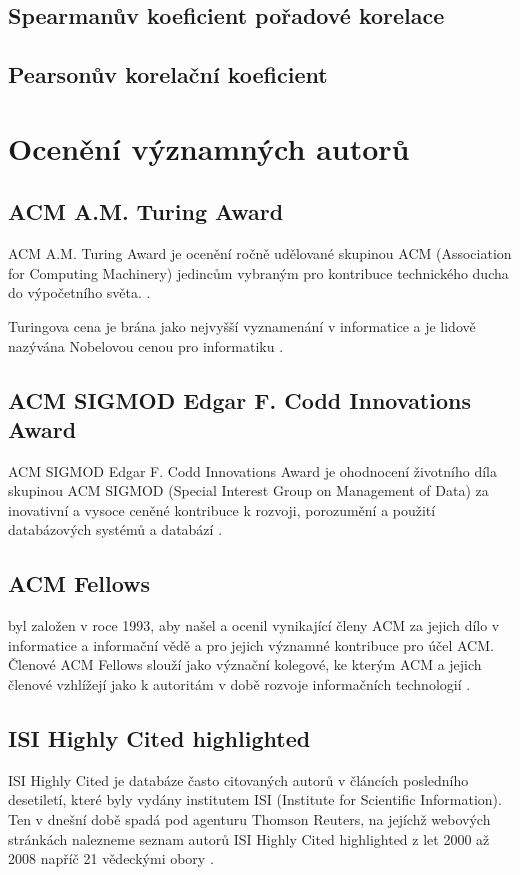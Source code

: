 \documentclass[12pt,titlepage]{report}
\begin{document}
\subsection{Spearmanův koeficient pořadové korelace}
\subsection{Pearsonův korelační koeficient}

\section{Ocenění významných autorů}
\subsection{ACM A.M. Turing Award}
ACM A.M. Turing Award je ocenění ročně udělované skupinou ACM (Association for
Computing Machinery) jedincům vybraným pro kontribuce technického ducha do
výpočetního světa.
\cite{turingaward}.

Turingova cena je brána jako nejvyšší vyznamenání v informatice a je lidově
nazývána Nobelovou cenou pro informatiku \cite[p.~317]{dasgupta}.

\subsection{ACM SIGMOD Edgar F. Codd Innovations Award}
ACM SIGMOD Edgar F. Codd Innovations Award je ohodnocení životního díla
skupinou ACM SIGMOD (Special Interest Group on Management of Data)  za
inovativní a vysoce ceněné kontribuce k rozvoji, porozumění a použití
databázových systémů a databází \cite{sigmodinnovations}.

\subsection{ACM Fellows}
 byl založen v roce 1993, aby našel a ocenil
vynikající členy ACM za jejich dílo v informatice a informační vědě a pro
jejich významné kontribuce pro účel ACM. Členové ACM Fellows slouží jako
význační kolegové, ke kterým ACM a jejich členové vzhlížejí jako k autoritám v
době rozvoje informačních technologií \cite{acmfellows}.

\subsection{ISI Highly Cited highlighted}
ISI Highly Cited je databáze často citovaných autorů v článcích posledního
desetiletí, které byly vydány institutem ISI (Institute for Scientific
Information). Ten v dnešní době spadá pod agenturu Thomson Reuters, na jejíchž webových stránkách nalezneme seznam autorů ISI Highly Cited highlighted z let 2000 až 2008 napříč 21 vědeckými obory \cite{highlycited}.
\end{document}
